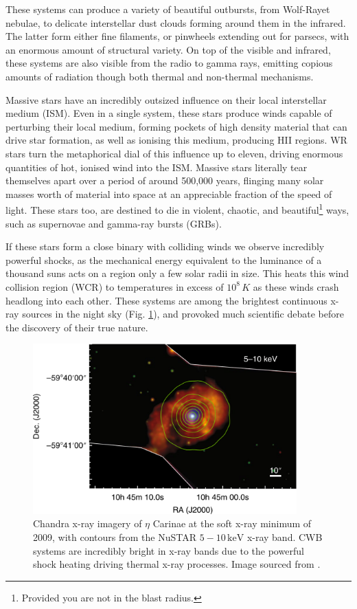 These systems can produce a variety of beautiful outbursts, from Wolf-Rayet nebulae, to delicate interstellar dust clouds forming around them in the infrared.
The latter form either fine filaments, or pinwheels extending out for parsecs, with an enormous amount of structural variety.
On top of the visible and infrared, these systems are also visible from the radio to gamma rays, emitting copious amounts of radiation though both thermal and non-thermal mechanisms.

Massive stars have an incredibly outsized influence on their local interstellar medium (ISM).
Even in a single system, these stars produce winds capable of perturbing their local medium, forming pockets of high density material that can drive star formation, as well as ionising this medium, producing HII regions.
WR stars turn the metaphorical dial of this influence up to eleven, driving enormous quantities of hot, ionised wind into the ISM.
Massive stars literally tear themselves apart over a period of around 500,000 years, flinging many solar masses worth of material into space at an appreciable fraction of the speed of light.
These stars too, are destined to die in violent, chaotic, and beautiful\footnote{Provided you are not in the blast radius.} ways, such as supernovae and gamma-ray bursts (GRBs).

If these stars form a close binary with colliding winds we observe incredibly powerful shocks, as the mechanical energy equivalent to the luminance of a thousand suns acts on a region only a few solar radii in size.
This heats this wind collision region (WCR) to temperatures in excess of $10^8 \, \si{K}$ as these winds crash headlong into each other.
These systems are among the brightest continuous x-ray sources in the night sky (Fig. \ref{fig:intro-xray}), and provoked much scientific debate before the discovery of their true nature. 

\begin{figure}[ht]
  \centering
  \includegraphics[width=4in]{assets/wolf-rayets/x-ray.png}
  \caption[\emph{Chandra \& NuSTAR imagery of $\eta$ Carinae \parencite{hamaguchiNonthermalXraysColliding2018}}]{Chandra x-ray imagery of $\eta$ Carinae at the soft x-ray minimum of 2009, with contours from the NuSTAR $5-10 \, \si{\kilo\electronvolt}$ x-ray band. CWB systems are incredibly bright in x-ray bands due to the powerful shock heating driving thermal x-ray processes. Image sourced from \textcite{hamaguchiNonthermalXraysColliding2018}.}
  \label{fig:intro-xray}
\end{figure}

